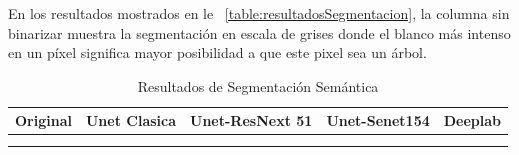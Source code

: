 En los resultados mostrados en le \tablename~\ref{table:resultadosSegmentacion}, la columna sin binarizar muestra la segmentación en escala de grises donde el blanco más intenso en un píxel significa mayor posibilidad a que este pixel sea un árbol.
\begin{table}[H]
\caption{Resultados de Segmentación Semántica }

\begin{tabular}{|M{0.19\textwidth}|M{0.19\textwidth}|M{0.19\textwidth}|M{0.19\textwidth}|M{0.19\textwidth}|}
 \hline Original & Unet Clasica& Unet-ResNext 51 &  Unet-Senet154 & Deeplab \\
 \hline
\medskip  {}
 &\medskip {}
  & \medskip\medskip {}
    & \medskip\medskip {}
      & \medskip\medskip {}
  \\
\medskip  {}

\end{tabular}
\end{table}
